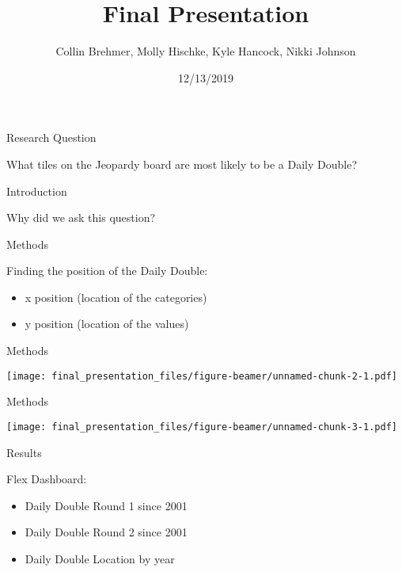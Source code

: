 \documentclass[ignorenonframetext,]{beamer}
\title{Final Presentation}
\author{Collin Brehmer, Molly Hischke, Kyle Hancock, Nikki Johnson}
\date{12/13/2019}
\providecommand{\tightlist}{%
  \setlength{\itemsep}{0pt}\setlength{\parskip}{0pt}}
\begin{document}
\frame{\titlepage}

\begin{frame}{Research Question}
\protect\hypertarget{research-question}{}

What tiles on the Jeopardy board are most likely to be a Daily Double?

\end{frame}

\begin{frame}{Introduction}
\protect\hypertarget{introduction}{}

Why did we ask this question?

\end{frame}

\begin{frame}{Methods}
\protect\hypertarget{methods}{}

Finding the position of the Daily Double:

\begin{itemize}
\tightlist
\item
  x position (location of the categories)
\item
  y position (location of the values)
\end{itemize}

\end{frame}

\begin{frame}{Methods}
\protect\hypertarget{methods-1}{}

\texttt{[image: final\_presentation\_files/figure-beamer/unnamed-chunk-2-1.pdf]}

\end{frame}

\begin{frame}{Methods}
\protect\hypertarget{methods-2}{}

\texttt{[image: final\_presentation\_files/figure-beamer/unnamed-chunk-3-1.pdf]}

\end{frame}

\begin{frame}{Results}
\protect\hypertarget{results}{}

Flex Dashboard:

\begin{itemize}
\tightlist
\item
  Daily Double Round 1 since 2001
\item
  Daily Double Round 2 since 2001
\item
  Daily Double Location by year
\end{itemize}

\end{frame}
\end{document}
